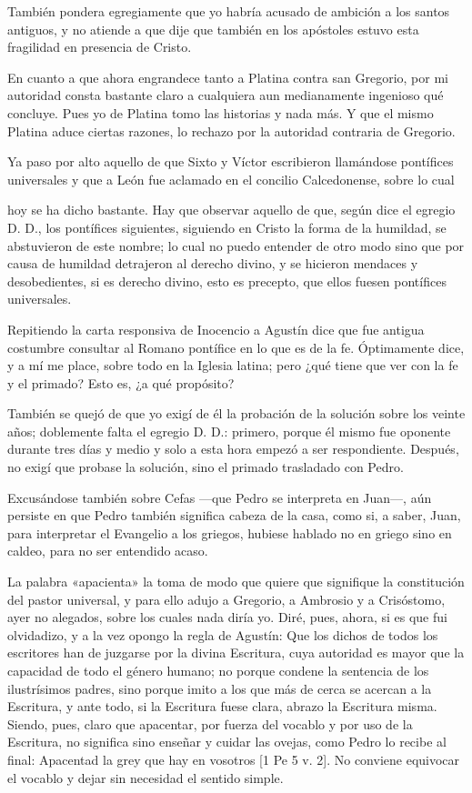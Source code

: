 También pondera egregiamente que yo habría acusado de ambición a los santos antiguos, y no atiende a que dije que también en los apóstoles estuvo esta fragilidad en presencia de Cristo.

En cuanto a que ahora engrandece tanto a Platina contra san Gregorio, por mi autoridad consta bastante claro a cualquiera aun medianamente ingenioso qué concluye. Pues yo de Platina tomo las historias y nada más. Y que el mismo Platina aduce ciertas razones, lo rechazo por la autoridad contraria de Gregorio.

Ya paso por alto aquello de que Sixto y Víctor escribieron llamándose pontífices universales y que a León fue aclamado en el concilio Calcedonense, sobre lo cual

hoy se ha dicho bastante. Hay que observar aquello de que, según dice el egregio D. D., los pontífices siguientes, siguiendo en Cristo la forma de la humildad, se abstuvieron de este nombre; lo cual no puedo entender de otro modo sino que por causa de humildad detrajeron al derecho divino, y se hicieron mendaces y desobedientes, si es derecho divino, esto es precepto, que ellos fuesen pontífices universales.

Repitiendo la carta responsiva de Inocencio a Agustín dice que fue antigua costumbre consultar al Romano pontífice en lo que es de la fe. Óptimamente dice, y a mí me place, sobre todo en la Iglesia latina; pero ¿qué tiene que ver con la fe y el primado? Esto es, ¿a qué propósito?

También se quejó de que yo exigí de él la probación de la solución sobre los veinte años; doblemente falta el egregio D. D.: primero, porque él mismo fue oponente durante tres días y medio y solo a esta hora empezó a ser respondiente. Después, no exigí que probase la solución, sino el primado trasladado con Pedro.

Excusándose también sobre Cefas —que Pedro se interpreta en Juan—, aún persiste en que Pedro también significa cabeza de la casa, como si, a saber, Juan, para interpretar el Evangelio a los griegos, hubiese hablado no en griego sino en caldeo, para no ser entendido acaso.

La palabra «apacienta» la toma de modo que quiere que signifique la constitución del pastor universal, y para ello adujo a Gregorio, a Ambrosio y a Crisóstomo, ayer no alegados, sobre los cuales nada diría yo. Diré, pues, ahora, si es que fui olvidadizo, y a la vez opongo la regla de Agustín: Que los dichos de todos los escritores han de juzgarse por la divina Escritura, cuya autoridad es mayor que la capacidad de todo el género humano; no porque condene la sentencia de los ilustrísimos padres, sino porque imito a los que más de cerca se acercan a la Escritura, y ante todo, si la Escritura fuese clara, abrazo la Escritura misma. Siendo, pues, claro que apacentar, por fuerza del vocablo y por uso de la Escritura, no significa sino enseñar y cuidar \marginpar{\small[310]} las ovejas, como Pedro lo recibe al final: Apacentad la grey que hay en vosotros [1 Pe 5 v. 2]. No conviene equivocar el vocablo y dejar sin necesidad el sentido simple.

